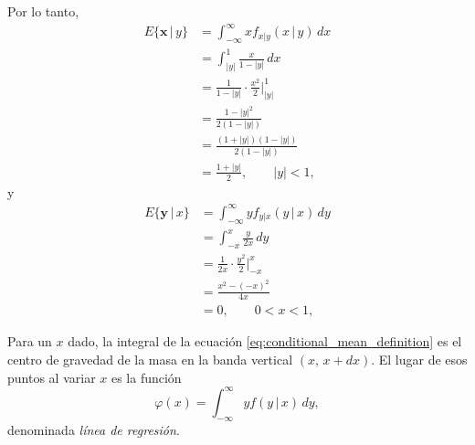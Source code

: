 \documentclass[a4paper]{report}
\newcommand{\x}{\mathbf{x}}
\newcommand{\y}{\mathbf{y}}
\begin{document}
Por lo tanto,
\begin{align*}
 E\{\x\,|\,y\}&=\int_{-\infty}^{\infty}xf_{x|y}(x\,|\,y)\,dx\\
   &=\int_{|y|}^{1}\frac{x}{1-|y|}\,dx\\
   &=\frac{1}{1-|y|}\cdot\frac{x^2}{2}\bigg|_{|y|}^{1}\\
   &=\frac{1-|y|^2}{2(1-|y|)}\\
   &=\frac{(1+|y|)(1-|y|)}{2(1-|y|)}\\
   &=\frac{1+|y|}{2},\qquad |y|<1,
\end{align*}
y
\begin{align*}
 E\{\y\,|\,x\}&=\int_{-\infty}^{\infty}yf_{y|x}(y\,|\,x)\,dy\\
   &=\int_{-x}^{x}\frac{y}{2x}\,dy\\
   &=\frac{1}{2x}\cdot\frac{y^2}{2}\bigg|_{-x}^{x}\\
   &=\frac{x^2-(-x)^2}{4x}\\
   &=0,\qquad 0<x<1,
\end{align*}


Para un \(x\) dado, la integral de la ecuación \ref{eq:conditional_mean_definition} es el centro de gravedad de la masa en la banda vertical \((x,\,x+dx)\). El lugar de esos puntos al variar \(x\) es la función
\begin{equation}\label{eq:linear_regression}
 \varphi(x)=\int_{-\infty}^{\infty}yf(y\,|\,x)\,dy,
\end{equation}
denominada \emph{línea de regresión}.
\end{document}
